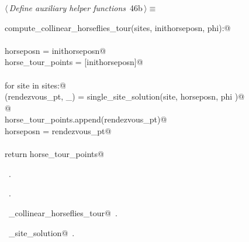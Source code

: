 \documentclass[11.5pt]{report}
\begin{document}

\begin{flushleft} \small
\begin{minipage}{\linewidth}\label{scrap66}\raggedright\small
{} $\langle\,${\itshape Define auxiliary helper functions}\nobreak\ {\footnotesize {46b}}$\,\rangle\equiv$
\vspace{-1ex}
\begin{list}{}{} \item
\mbox{}\verb@def compute_collinear_horseflies_tour(sites, inithorseposn, phi):@\\
\mbox{}\verb@@\\
\mbox{}\verb@      horseposn         = inithorseposn@\\
\mbox{}\verb@      horse_tour_points = [inithorseposn]@\\
\mbox{}\verb@@\\
\mbox{}\verb@      for site in sites:@\\
\mbox{}\verb@          (rendezvous_pt, _) = single_site_solution(site, horseposn, phi )@\\
\mbox{}\verb@            @\\
\mbox{}\verb@          horse_tour_points.append(rendezvous_pt)@\\
\mbox{}\verb@          horseposn = rendezvous_pt@\\
\mbox{}\verb@@\\
\mbox{}\verb@      return horse_tour_points@\\
\mbox{}\verb@@{\NWsep}
\end{list}
\vspace{-1.5ex}
\footnotesize
\begin{list}{}{\setlength{\itemsep}{-\parsep}\setlength{\itemindent}{-\leftmargin}}
\item \NWtxtMacroDefBy\ .
\item \NWtxtMacroRefIn\ .
\item \NWtxtIdentsDefed\nobreak\  \verb@compute_collinear_horseflies_tour@\nobreak\ .\item \NWtxtIdentsUsed\nobreak\  \verb@single_site_solution@\nobreak\ .
\item{}
\end{list}
\end{minipage}\vspace{4ex}
\end{flushleft}
\end{document}
